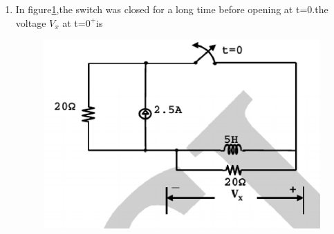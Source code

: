 \documentclass[journal,12pt,twocolumn]{IEEEtran}
\begin{document}
\begin{enumerate}
\item In figure\ref{fig43},the switch was closed for a long time before opening at t=0.the voltage $V_{x}$ at t=$0^{+}$is
\begin{enumerate}
\setlength\itemsep{2em}
\begin{figure}[!h]
\begin{center}
\includegraphics[scale=0.5]{./figs/fig43.eps}
\caption{}
\label{fig43}
\end{center}
\end{figure}
\end{enumerate}


\end{enumerate}
\end{document}
